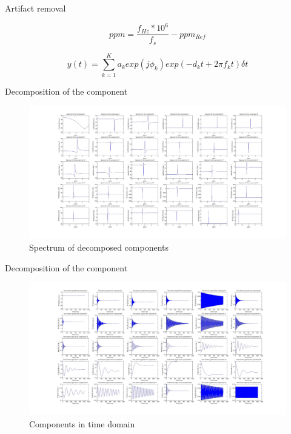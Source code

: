 \documentclass[t,12pt,english
\ifx\beamermode\undefined\else,\beamermode\fi
]{beamer}
\begin{document}
\begin{frame}{Artifact removal}
 

\begin{equation}
ppm=\frac{f_{Hz}*10^6}{f_{s}}-ppm_{Ref}
\end{equation}
    

\begin{equation}\label{eq1}
y(t)=\sum_{k=1}^{K} a_{k}exp(j\phi_{k})exp(-d_{k}t+2\pi f_{k}t)\delta t
\end{equation}
   
\end{frame}

\begin{frame}{Decomposition of the component}

\begin{figure}[!htbp]
\centering
\includegraphics[width=1\textwidth]{5.jpg}
\caption{\tiny{Spectrum of decomposed components }}
\end{figure}

\end{frame}

\begin{frame}{Decomposition of the component}

\begin{figure}[!htbp]
\centering
\includegraphics[width=1\textwidth]{6.jpg}
\caption{\tiny{Components in time domain}}
\end{figure}
    
\end{frame}
\end{document}
